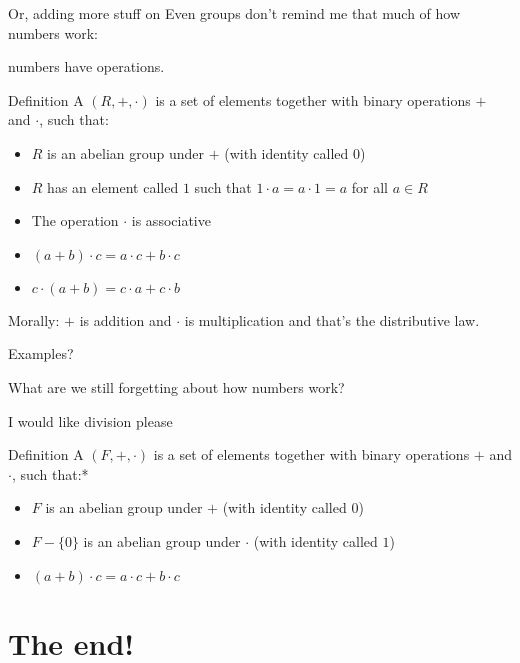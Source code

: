 \documentclass[8pt, handout]{beamer}
\begin{document}
\begin{frame}{Or, adding more stuff on}
  Even groups don't remind me that much of how numbers work: 
  
  numbers have  operations. \pause
  
  \medskip

  \begin{block}{Definition}
    A  $(R, +, \cdot)$ is a set of elements together with  binary operations $+$ and $\cdot$, such that: \pause
    \begin{itemize}
      \item $R$ is an abelian group under $+$ (with identity called $0$) \pause
      \item $R$ has an element called $1$ such that $1\cdot a = a \cdot 1 = a$ for all $a\in R$ \pause
      \item The operation $\cdot$ is associative \pause
      \item $(a+b)\cdot c = a\cdot c + b\cdot c$
      \item $c\cdot (a+b) = c\cdot a + c\cdot b$
    \end{itemize}
  \end{block}\pause 

  \begin{exampleblock}{Morally:}
    $+$ is addition and $\cdot$ is multiplication and that's the distributive law.
  \end{exampleblock} \pause

  \medskip

  Examples?

  \medskip

  What are we still forgetting about how numbers work?
\end{frame}


\begin{frame}{I would like division please}
  \begin{block}{Definition}
    A  $(F, +, \cdot)$ is a set of elements together with  binary operations $+$ and $\cdot$, such that:*
    \begin{itemize}
      \item $F$ is an abelian group under $+$ (with identity called $0$) \pause
      \item $F - \{0\}$ is an abelian group under $\cdot$ (with identity called $1$) \pause
      \item $(a+b)\cdot c = a\cdot c + b\cdot c$
    \end{itemize}
  \end{block}
\end{frame}

\section*{The end!}
\end{document}
